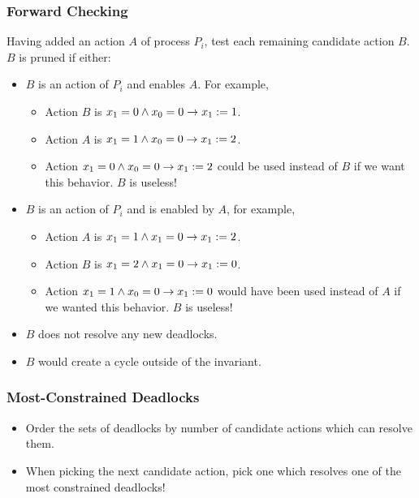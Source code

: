 \documentclass[handout]{beamer}
\begin{document}
\begin{frame}
\frametitle{Forward Checking}
Having added an action $A$ of process $P_i$, test each remaining candidate action $B$.
$B$ is pruned if either:
\begin{itemize}
\item $B$ is an action of $P_i$ and enables $A$. For example,
 \begin{itemize}
 \item[] Action $B$ is $x_1 = 0 \wedge x_0 = 0 \to x_1:= 1$.
 \item[] Action $A$ is $x_1 = 1 \wedge x_0 = 0 \to x_1:= 2$.
 \item Action $x_1 = 0 \wedge x_0 = 0 \to x_1:= 2$ could be used instead of $B$ if we want this behavior. $B$ is useless!
 \end{itemize}
\item $B$ is an action of $P_i$ and is enabled by $A$, for example,
 \begin{itemize}
 \item[] Action $A$ is $x_1 = 1 \wedge x_1 = 0 \to x_1:= 2$.
 \item[] Action $B$ is $x_1 = 2 \wedge x_1 = 0 \to x_1:= 0$.
 \item Action $x_1 = 1 \wedge x_0 = 0 \to x_1:= 0$ would have been used instead of $A$ if we wanted this behavior. $B$ is useless!
 \end{itemize}
\item $B$ does not resolve any new deadlocks.
\item $B$ would create a cycle outside of the invariant.
\end{itemize}
\end{frame}

\begin{frame}
\frametitle{Most-Constrained Deadlocks}
\begin{itemize}
\item Order the sets of deadlocks by number of candidate actions which can resolve them.
\item When picking the next candidate action, pick one which resolves one of the most constrained deadlocks!
\end{itemize}
\end{frame}

%
\end{document}
